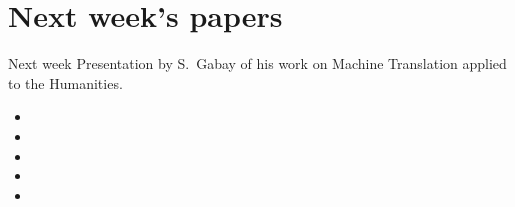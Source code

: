 \documentclass[aspectratio=169]{beamer}
\begin{document}
\section{Next week's papers}

\begin{frame}{Next week}
    \small Presentation by S.~Gabay of his work on Machine Translation applied to the Humanities.
    {\footnotesize
    \begin{itemize}
        \item {}
        \item {}
        \item {}
        \item {}
        \item {}
    \end{itemize}
    }
\end{frame}
\end{document}
